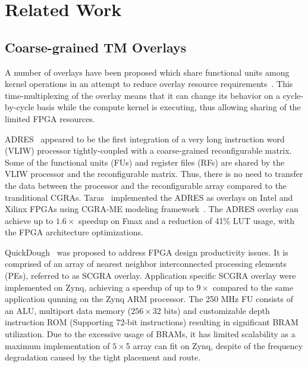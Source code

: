 \section{Related Work}
\label{section_2}


\subsection{Coarse-grained TM Overlays}
A number of overlays have been proposed which share functional units among kernel operations in an attempt to reduce overlay resource requirements~\cite{severance2013embedded, liu2015quickdough, taras2019impact}.
This time-multiplexing of the overlay means that it can change its behavior on a cycle-by-cycle basis while the compute kernel is executing, thus allowing sharing of the limited FPGA resources.


ADRES~\cite{mei2003adres} appeared to be the first integration of a very long instruction word (VLIW) processor tightly-coupled with a coarse-grained reconfigurable matrix. 
Some of the functional units (FUs) and register files (RFs) are shared by the VLIW processor and the reconfigurable matrix. 
Thus, there is no need to transfer the data between the processor and the reconfigurable array compared to the tranditional CGRAs. 
Taras~\cite{taras2019impact} implemented the ADRES as overlays on Intel and Xilinx FPGAs using CGRA-ME modeling framework~\cite{chin2017cgra}. 
The ADRES overlay can achieve up to $1.6\times$ speedup on Fmax and a reduction of 41\% LUT usage, with the FPGA architecture optimizations. 


QuickDough~\cite{liu2015quickdough} was proposed to address FPGA design productivity issues. 
It is comprised of an array of nearest neighbor interconnected processing elements (PEs), referred to as SCGRA overlay.  
Application specific SCGRA overlay were implemented on Zynq, achieving a speedup of up to $9\times$ compared to the same application qunning on the Zynq ARM processor. 
The 250 MHz FU consists of an ALU, multiport data memory ($256\times$32 bits) and customizable depth instruction ROM (Supporting 72-bit instructions) resulting in significant BRAM utilization. 
Due to the excessive usage of BRAMs, it has limited scalability as a maximum implementation of $5\times$5 array can fit on Zynq, despite of the frequency degradation caused by the tight placement and route. 


